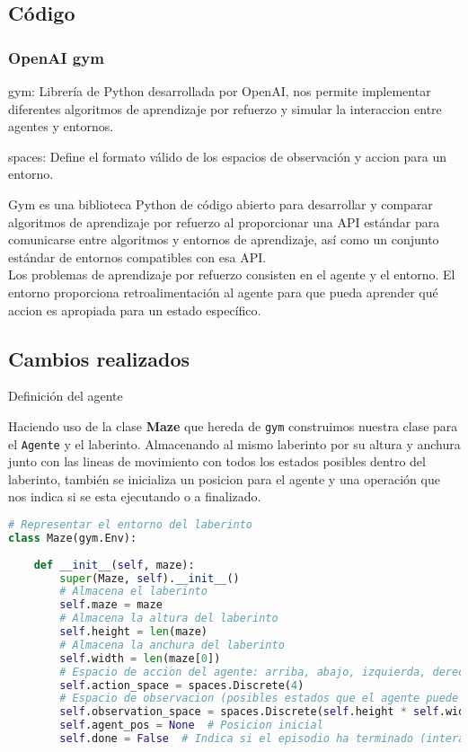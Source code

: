 \documentclass[a4paper,12pt]{article}
\begin{document}
\subsection{Código}

\subsubsection*{OpenAI gym}

gym: Librería de Python desarrollada por OpenAI, nos permite implementar diferentes 
algoritmos de aprendizaje por refuerzo y simular la interaccion entre agentes y entornos.

spaces: Define el formato válido de los espacios de observación y accion para un entorno.

Gym es una biblioteca Python de código abierto para desarrollar y comparar 
algoritmos de aprendizaje por refuerzo al proporcionar una API estándar 
para comunicarse entre algoritmos y entornos de aprendizaje, así como un 
conjunto estándar de entornos compatibles con esa API. \cite{docGym} \\



Los problemas de aprendizaje por refuerzo consisten en el agente y 
el entorno. El entorno proporciona retroalimentación al agente para 
que pueda aprender qué accion es apropiada para un estado específico.

\subsection{Cambios realizados}

\begin{center}
    \Large{Definición del agente}
\end{center}

\noindent Haciendo uso de la clase \textbf{Maze} que hereda de \texttt{gym} construimos 
nuestra clase para el \texttt{Agente} y el laberinto. Almacenando al mismo laberinto 
por su altura y anchura junto con las lineas de movimiento con todos los estados posibles 
dentro del laberinto, también se inicializa un posicion para el agente y una operación 
que nos indica si se esta ejecutando o a finalizado.

\begin{lstlisting}[style=mystylepython, language=Python, caption= Definición del agente]
# Representar el entorno del laberinto
class Maze(gym.Env):
    
    def __init__(self, maze):
        super(Maze, self).__init__()
        # Almacena el laberinto
        self.maze = maze  
        # Almacena la altura del laberinto
        self.height = len(maze)  
        # Almacena la anchura del laberinto
        self.width = len(maze[0])  
        # Espacio de accion del agente: arriba, abajo, izquierda, derecha
        self.action_space = spaces.Discrete(4)  
        # Espacio de observacion (posibles estados que el agente puede observar del entorno)
        self.observation_space = spaces.Discrete(self.height * self.width) 
        self.agent_pos = None  # Posicion inicial 
        self.done = False  # Indica si el episodio ha terminado (interacciones entre el agente y el entorno )
\end{lstlisting}
\end{document}
